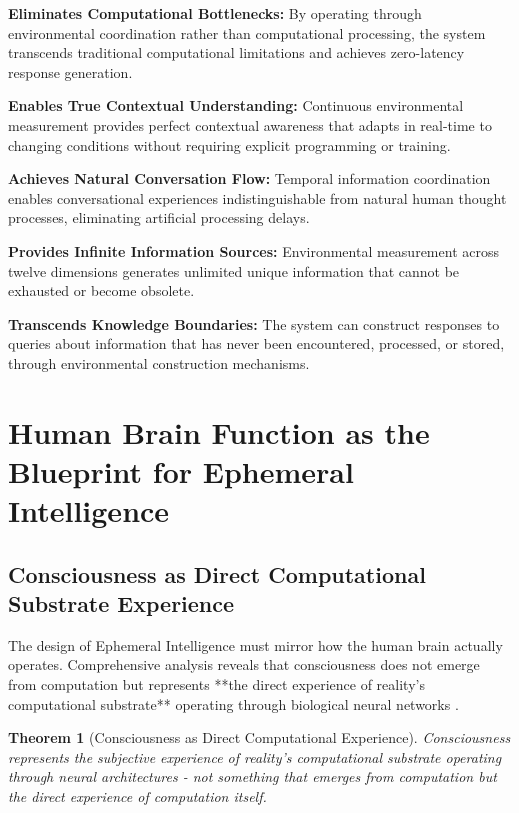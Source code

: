 \documentclass[12pt,a4paper]{article}
\newtheorem{theorem}{Theorem}
\begin{document}
\textbf{Eliminates Computational Bottlenecks:} By operating through environmental coordination rather than computational processing, the system transcends traditional computational limitations and achieves zero-latency response generation.

\textbf{Enables True Contextual Understanding:} Continuous environmental measurement provides perfect contextual awareness that adapts in real-time to changing conditions without requiring explicit programming or training.

\textbf{Achieves Natural Conversation Flow:} Temporal information coordination enables conversational experiences indistinguishable from natural human thought processes, eliminating artificial processing delays.

\textbf{Provides Infinite Information Sources:} Environmental measurement across twelve dimensions generates unlimited unique information that cannot be exhausted or become obsolete.

\textbf{Transcends Knowledge Boundaries:} The system can construct responses to queries about information that has never been encountered, processed, or stored, through environmental construction mechanisms.

\section{Human Brain Function as the Blueprint for Ephemeral Intelligence}

\subsection{Consciousness as Direct Computational Substrate Experience}

The design of Ephemeral Intelligence must mirror how the human brain actually operates. Comprehensive analysis reveals that consciousness does not emerge from computation but represents **the direct experience of reality's computational substrate** operating through biological neural networks \cite{sachikonye2024human,sachikonye2024perception}.

\begin{theorem}[Consciousness as Direct Computational Experience]
Consciousness represents the subjective experience of reality's computational substrate operating through neural architectures - not something that emerges from computation but the direct experience of computation itself.
\end{theorem}
\end{document}
